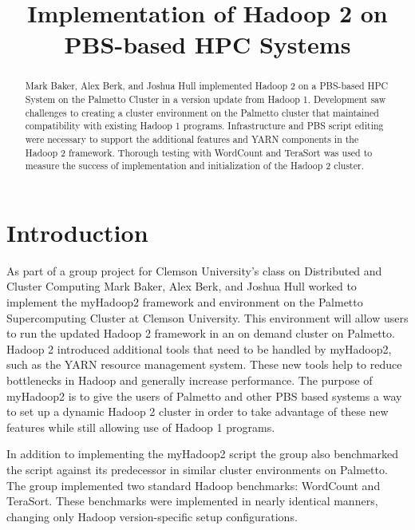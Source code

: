 \documentclass[conference]{IEEEtran}
\begin{document}
	\title{Implementation of Hadoop 2 on PBS-based HPC Systems}
	\author{
	}

	\maketitle

	\begin{abstract}
		Mark Baker, Alex Berk, and Joshua Hull implemented Hadoop 2 on a PBS-based HPC System on the Palmetto Cluster in a version update from Hadoop 1. Development saw challenges to creating a cluster environment on the Palmetto cluster that maintained compatibility with existing Hadoop 1 programs. Infrastructure and PBS script editing were necessary to support the additional features and YARN components in the Hadoop 2 framework. Thorough testing with WordCount and TeraSort was used to measure the success of implementation and initialization of the Hadoop 2 cluster.
	\end{abstract}

	\section{Introduction}
		As part of a group project for Clemson University's class on Distributed and Cluster Computing Mark Baker, Alex Berk, and Joshua Hull worked to implement the myHadoop2 framework and environment on the Palmetto Supercomputing Cluster at Clemson University. This environment will allow users to run the updated Hadoop 2 framework in an on demand cluster on Palmetto. Hadoop 2 introduced additional tools that need to be handled by myHadoop2, such as the YARN resource management system. These new tools help to reduce bottlenecks in Hadoop and generally increase performance. The purpose of myHadoop2 is to give the users of Palmetto and other PBS based systems a way to set up a dynamic Hadoop 2 cluster in order to take advantage of these new features while still allowing use of Hadoop 1 programs.


        In addition to implementing the myHadoop2 script the group also benchmarked the script against its predecessor in similar cluster environments on Palmetto. The group implemented two standard Hadoop benchmarks: WordCount and TeraSort. These benchmarks were implemented in nearly identical manners, changing only Hadoop version-specific setup configurations.
\end{document}
